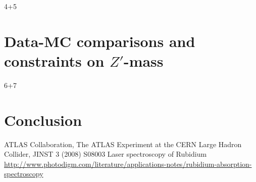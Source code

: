 4+5

\section{Data-MC comparisons and constraints on $Z'$-mass}
6+7

\section{Conclusion}

 \begin{thebibliography}{WissOnl}
 	 ATLAS Collaboration, The ATLAS Experiment at the CERN Large Hadron Collider, JINST 3 (2008) S08003
 	 Laser spectroscopy of Rubidium \\ \url{http://www.photodigm.com/literature/applications-notes/rubidium-absorption-spectroscopy}
 \end{thebibliography}




